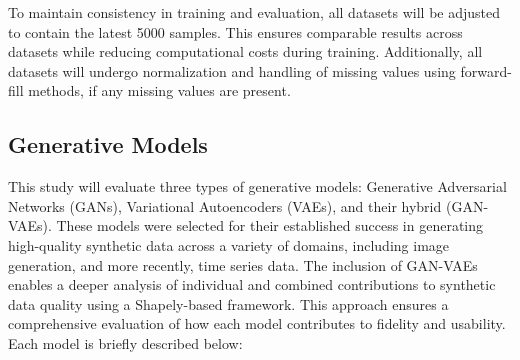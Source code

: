 \documentclass{article}
\begin{document}
To maintain consistency in training and evaluation, all datasets will be adjusted to contain the latest 5000 samples. This ensures comparable results across datasets while reducing computational costs during training. Additionally, all datasets will undergo normalization and handling of missing values using forward-fill methods, if any missing values are present.

\subsection{Generative Models}
This study will evaluate three types of generative models: Generative Adversarial Networks (GANs), Variational Autoencoders (VAEs), and their hybrid (GAN-VAEs). These models were selected for their established success in generating high-quality synthetic data across a variety of domains, including image generation, and more recently, time series data. The inclusion of GAN-VAEs enables a deeper analysis of individual and combined contributions to synthetic data quality using a Shapely-based framework. This approach ensures a comprehensive evaluation of how each model contributes to fidelity and usability.  Each model is briefly described below:
\end{document}
